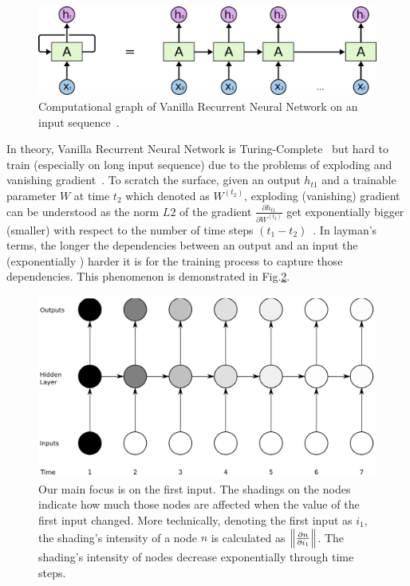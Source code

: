 \begin{figure}[H]
    \centering
    \includegraphics[scale=0.4]{figure/rnn-unroll}
    \caption[Vanilla Recurrent Neural Network]{Computational graph of Vanilla Recurrent Neural Network on an input sequence~\cite{colah-lsmt}.}
    \label{fig:rnn-unfold}
\end{figure}
\label{sec:gradient-vanish}
In theory, Vanilla Recurrent Neural Network is Turing-Complete~\cite{rnn-turing-complete} but  hard to train (especially on long input sequence) due to the problems of exploding and vanishing gradient~\cite{Bengio1994}.
To scratch the surface, given an output \(h_{t1}\) and a trainable parameter \(W\) at time \(t_2\) which denoted as \(W^{(t_2)}\),  exploding (vanishing) gradient can be understood as the norm \(L2\) of the gradient \(\frac{\partial h_{t1}}{\partial W^{(t_2)}}\) get exponentially bigger (smaller) with respect to the number of time steps \((t_1-t_2)\)~\cite{Bengio1994}.
In layman's terms, the longer the dependencies between an output and an input the (exponentially ) harder it is for the training process to capture those dependencies.
This phenomenon is demonstrated in Fig.\ref{fig:gradient-vanish}.

\begin{figure}[H]
    \centering
    \includegraphics[scale=0.37]{figure/gradient-vanish}
    \caption[Gradient exploding (vanishing) on RNN]{Our main focus is on the first input.
    The shadings on the nodes indicate how much those nodes are affected when the value of the first input changed.
    More technically, denoting the first input as \(i_1\), the shading's intensity of a node \(n\) is calculated as \(\left\lVert \frac{\partial n}{\partial i_1} \right\rVert\).
    The shading's intensity of nodes decrease exponentially through time steps.~\cite{Graves-thesis}}
    \label{fig:gradient-vanish}
\end{figure}


